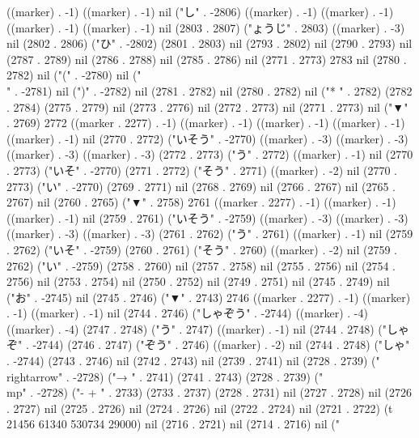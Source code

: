 ((marker) . -1) ((marker) . -1) nil ("し" . -2806) ((marker) . -1) ((marker) . -1) ((marker) . -1) ((marker) . -1) nil (2803 . 2807) ("ょうじ" . 2803) ((marker) . -3) nil (2802 . 2806) ("ひ" . -2802) (2801 . 2803) nil (2793 . 2802) nil (2790 . 2793) nil (2787 . 2789) nil (2786 . 2788) nil (2785 . 2786) nil (2771 . 2773) 2783 nil (2780 . 2782) nil ("(" . -2780) nil ("\\" . -2781) nil (")" . -2782) nil (2781 . 2782) nil (2780 . 2782) nil ("*
" . 2782) (2782 . 2784) (2775 . 2779) nil (2773 . 2776) nil (2772 . 2773) nil (2771 . 2773) nil ("▼" . 2769) 2772 ((marker . 2277) . -1) ((marker) . -1) ((marker) . -1) ((marker) . -1) ((marker) . -1) nil (2770 . 2772) ("いそう" . -2770) ((marker) . -3) ((marker) . -3) ((marker) . -3) ((marker) . -3) (2772 . 2773) ("う" . 2772) ((marker) . -1) nil (2770 . 2773) ("いそ" . -2770) (2771 . 2772) ("そう" . 2771) ((marker) . -2) nil (2770 . 2773) ("い" . -2770) (2769 . 2771) nil (2768 . 2769) nil (2766 . 2767) nil (2765 . 2767) nil (2760 . 2765) ("▼" . 2758) 2761 ((marker . 2277) . -1) ((marker) . -1) ((marker) . -1) nil (2759 . 2761) ("いそう" . -2759) ((marker) . -3) ((marker) . -3) ((marker) . -3) ((marker) . -3) (2761 . 2762) ("う" . 2761) ((marker) . -1) nil (2759 . 2762) ("いそ" . -2759) (2760 . 2761) ("そう" . 2760) ((marker) . -2) nil (2759 . 2762) ("い" . -2759) (2758 . 2760) nil (2757 . 2758) nil (2755 . 2756) nil (2754 . 2756) nil (2753 . 2754) nil (2750 . 2752) nil (2749 . 2751) nil (2745 . 2749) nil ("お" . -2745) nil (2745 . 2746) ("▼" . 2743) 2746 ((marker . 2277) . -1) ((marker) . -1) ((marker) . -1) nil (2744 . 2746) ("しゃぞう" . -2744) ((marker) . -4) ((marker) . -4) (2747 . 2748) ("う" . 2747) ((marker) . -1) nil (2744 . 2748) ("しゃぞ" . -2744) (2746 . 2747) ("ぞう" . 2746) ((marker) . -2) nil (2744 . 2748) ("しゃ" . -2744) (2743 . 2746) nil (2742 . 2743) nil (2739 . 2741) nil (2728 . 2739) ("\\rightarrow" . -2728) ("→
" . 2741) (2741 . 2743) (2728 . 2739) ("\\mp" . -2728) ("-
+
" . 2733) (2733 . 2737) (2728 . 2731) nil (2727 . 2728) nil (2726 . 2727) nil (2725 . 2726) nil (2724 . 2726) nil (2722 . 2724) nil (2721 . 2722) (t 21456 61340 530734 29000) nil (2716 . 2721) nil (2714 . 2716) nil ("
